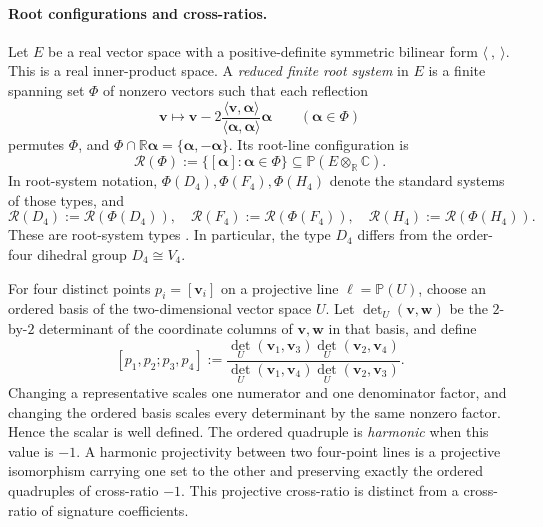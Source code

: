 \documentclass[11pt,letterpaper,onecolumn]{article}
\theoremstyle{plain}
\theoremstyle{definition}
\theoremstyle{remark}
\begin{document}
\paragraph{Root configurations and cross-ratios.}
\label{subsubsec:root-incidence}

Let \(E\) be a real vector space with a positive-definite symmetric bilinear
form \(\langle\ ,\ \rangle\). This is a real inner-product space.  A
\emph{reduced finite root system} in \(E\) is a finite spanning set \(\Phi\)
of nonzero vectors such that
each reflection
\[
 {\mathbf{v}}\longmapsto
 {\mathbf{v}}-2\frac{\langle {\mathbf{v}},{\boldsymbol{\alpha}}\rangle}{\langle{\boldsymbol{\alpha}},{\boldsymbol{\alpha}}\rangle}{\boldsymbol{\alpha}}
 \qquad({\boldsymbol{\alpha}}\in\Phi)
\]
permutes \(\Phi\), and
\(\Phi\cap\mathbb R{\boldsymbol{\alpha}}=\{{\boldsymbol{\alpha}},-{\boldsymbol{\alpha}}\}\).  Its root-line
configuration is
\[
 \mathcal R(\Phi):=\{[{\boldsymbol{\alpha}}]:{\boldsymbol{\alpha}}\in\Phi\}
 \subseteq\mathbb P(E\otimes_{\mathbb R}\mathbb C).
\]
In root-system notation, \(\Phi(D_4),\Phi(F_4),\Phi(H_4)\) denote the
standard systems of those types, and
\[
 \mathcal R(D_4):=\mathcal R(\Phi(D_4)),\quad
 \mathcal R(F_4):=\mathcal R(\Phi(F_4)),\quad
 \mathcal R(H_4):=\mathcal R(\Phi(H_4)).
\]
These are root-system types \cite{Humphreys1990}. In particular, the type
\(D_4\) differs from the order-four dihedral group \(D_4\cong V_4\).

For four distinct points \(p_i=[{\mathbf{v}}_i]\) on a projective line
\(\ell=\mathbb P(U)\), choose an ordered basis of the two-dimensional vector
space \(U\).  Let \(\det_U({\mathbf{v}},{\mathbf{w}})\) be the \(2\)-by-\(2\) determinant of the
coordinate columns of \({\mathbf{v}},{\mathbf{w}}\) in that basis, and define
\[
 [p_1,p_2;p_3,p_4]
 :=
 \frac{\det_U({\mathbf{v}}_1,{\mathbf{v}}_3)\det_U({\mathbf{v}}_2,{\mathbf{v}}_4)}
      {\det_U({\mathbf{v}}_1,{\mathbf{v}}_4)\det_U({\mathbf{v}}_2,{\mathbf{v}}_3)}.
\]
Changing a representative scales one numerator and one denominator factor,
and changing the ordered basis scales every determinant by the same nonzero
factor.  Hence the scalar is well defined.  The ordered quadruple is
\emph{harmonic} when this value
is \(-1\).  A harmonic projectivity between two four-point lines is a
projective isomorphism carrying one set to the other and preserving exactly
the ordered quadruples of cross-ratio \(-1\).  This projective cross-ratio
is distinct from a cross-ratio of signature coefficients.
\end{document}
